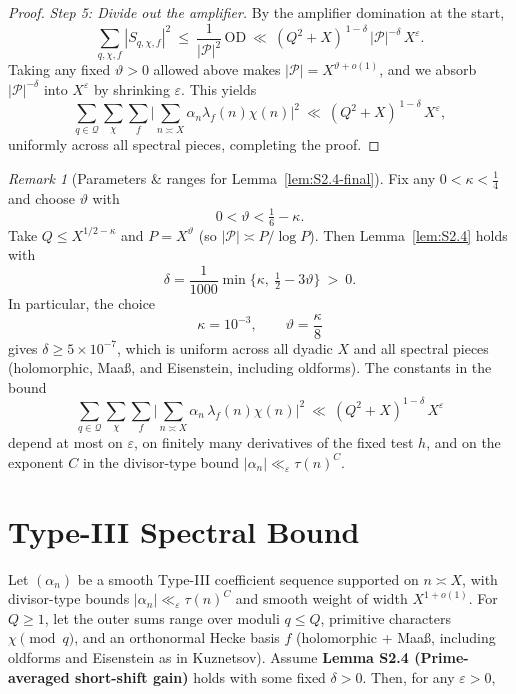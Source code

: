 \documentclass[11pt]{article}
\theoremstyle{definition}
\theoremstyle{remark}
\newtheorem{remark}[lemma]{Remark}
\numberwithin{equation}{part}
\begin{document}
\begin{proof}
	\emph{Step 5: Divide out the amplifier.}
	By the amplifier domination at the start,
	\[
		\sum_{q,\chi,f} |S_{q,\chi,f}|^2 \ \le\ \frac{1}{|\mathcal P|^2}\,\mathrm{OD}
		\ \ll\ (Q^2+X)^{\,1-\delta}\,|\mathcal P|^{-\delta}\,X^\varepsilon.
	\]
	Taking any fixed $\vartheta>0$ allowed above makes $|\mathcal P|=X^{\vartheta+o(1)}$, and we absorb $|\mathcal P|^{-\delta}$ into $X^\varepsilon$ by shrinking $\varepsilon$. This yields
	\[
		\sum_{q\in\mathcal Q}\sum_{\chi}\sum_f \Big|\sum_{n\asymp X}\alpha_n\lambda_f(n)\chi(n)\Big|^2
		\ \ll\ (Q^2+X)^{\,1-\delta}\,X^\varepsilon,
	\]
	uniformly across all spectral pieces, completing the proof.
\end{proof}

\begin{remark}[Parameters \& ranges for Lemma~\ref{lem:S2.4-final}]
	Fix any $0<\kappa<\tfrac14$ and choose $\vartheta$ with
	\[
		0<\vartheta<\tfrac16-\kappa .
	\]
	Take $Q\le X^{1/2-\kappa}$ and $P=X^\vartheta$ (so $|\mathcal P|\asymp P/\log P$).
	Then Lemma~\ref{lem:S2.4} holds with
	\[
		\delta=\frac{1}{1000}\min\!\Big\{\kappa,\ \tfrac12-3\vartheta\Big\}\ >\ 0 .
	\]
	In particular, the choice
	\[
		\kappa=10^{-3},\qquad \vartheta=\frac{\kappa}{8}
	\]
	gives $\delta\ge 5\times 10^{-7}$, which is uniform across all dyadic $X$ and all spectral pieces (holomorphic, Maa\ss, and Eisenstein, including oldforms). The constants in the bound
	\[
		\sum_{q\in\mathcal Q}\sum_{\chi}\sum_f \Big|\sum_{n\asymp X}\alpha_n\,\lambda_f(n)\chi(n)\Big|^2
		\ \ll\ (Q^2+X)^{1-\delta}\,X^\varepsilon
	\]
	depend at most on $\varepsilon$, on finitely many derivatives of the fixed test $h$, and on the exponent $C$ in the divisor-type bound $|\alpha_n|\ll_\varepsilon \tau(n)^C$.
\end{remark}


\section{Type-III Spectral Bound}

\noindent Let $(\alpha_n)$ be a smooth Type-III coefficient sequence supported on $n\asymp X$, with divisor-type bounds $|\alpha_n|\ll_\varepsilon \tau(n)^C$ and smooth weight of width $X^{1+o(1)}$. For $Q\ge 1$, let the outer sums range over moduli $q\le Q$, primitive characters $\chi\pmod q$, and an orthonormal Hecke basis $f$ (holomorphic + Maa\ss, including oldforms and Eisenstein as in Kuznetsov). Assume \textbf{Lemma S2.4 (Prime-averaged short-shift gain)} holds with some fixed $\delta>0$. Then, for any $\varepsilon>0$,
\end{document}
